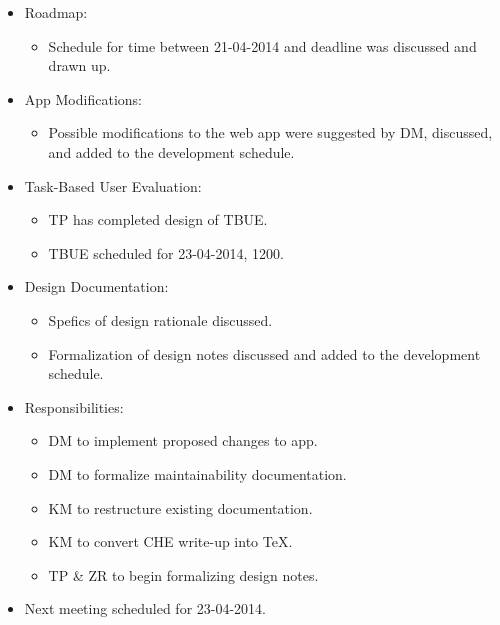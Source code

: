 \documentclass{article}
\begin{document}
\begin{itemize}
\item Roadmap:
  \begin{itemize}
  \item Schedule for time between 21-04-2014 and deadline was discussed and drawn up.
  \end{itemize}
\item App Modifications:
  \begin{itemize}
  \item Possible modifications to the web app were suggested by DM, discussed, and added to the development schedule.
  \end{itemize}
\item Task-Based User Evaluation:
  \begin{itemize}
  \item TP has completed design of TBUE.
  \item TBUE scheduled for 23-04-2014, 1200.
  \end{itemize}
\item Design Documentation:
  \begin{itemize}
    \item Spefics of design rationale discussed.
    \item Formalization of design notes discussed and added to the development schedule.
  \end{itemize}
\item Responsibilities:
  \begin{itemize}
    \item DM to implement proposed changes to app.
    \item DM to formalize maintainability documentation.
    \item KM to restructure existing documentation.
    \item KM to convert CHE write-up into TeX.
    \item TP & ZR to begin formalizing design notes.
  \end{itemize}
\item Next meeting scheduled for 23-04-2014.
\end{itemize}
\end{document}
